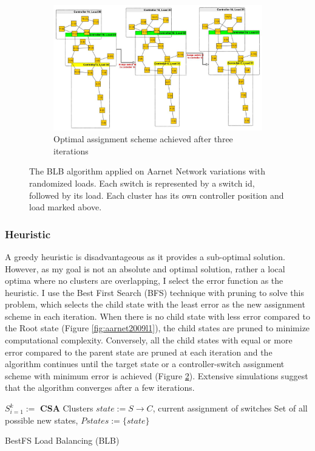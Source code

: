 \documentclass[journal]{IEEEtran}
\begin{document}
\begin{figure}
	~
	\begin{subfigure}{\textwidth}
		\includegraphics[width=\linewidth]{Images/Aarnet_Load_2.jpg}
		\caption{Optimal assignment scheme achieved after three iterations}
		\label{fig:aarnet2009l2}
	\end{subfigure}
	\caption{The BLB algorithm applied on Aarnet Network variations with randomized loads. Each switch is represented by a switch id, followed by its load. Each cluster has its own controller position and load marked above.}
\end{figure}

\subsubsection{Heuristic}
A greedy heuristic is disadvantageous as it provides a sub-optimal solution. However, as my goal is not an absolute and optimal solution, rather a local optima where no clusters are overlapping, I select the error function as the heuristic. I use the Best First Search (BFS) technique with pruning to solve this problem, which selects the child state with the least error as the new assignment scheme in each iteration. When there is no child state with less error compared to the Root state (Figure \ref{fig:aarnet2009l1}), the child states are pruned to minimize computational complexity. Conversely, all the child states with equal or more error compared to the parent state are pruned at each iteration and the algorithm continues until the target state or a controller-switch assignment scheme with minimum error is achieved  (Figure \ref{fig:aarnet2009l2}). Extensive simulations suggest that the algorithm converges after a few iterations.


\begin{algorithm}
	\SetAlgoLined
	$S_{i=1}^k := $ \textbf{CSA} Clusters\;
	$state := S \rightarrow C$, current assignment of switches\;
	Set of all possible new states, $Pstates := \{state\}$\;
	\caption{BestFS Load Balancing (BLB)} \label{algo:blb}
\end{algorithm}
\end{document}
